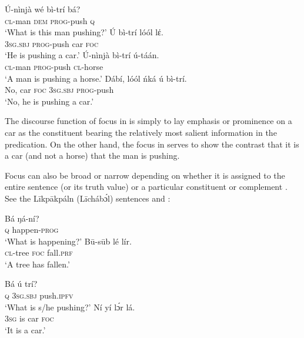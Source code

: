 \documentclass[output=paper,colorlinks,citecolor=brown]{langscibook}
\begin{document}
\ea%
    \label{ex:bisilki:4}
    \ea\label{ex:bisilki:4a}
    \gll    Ú-nìnjà	wé	bì-trí		bá?\\
            \textsc{cl-}man	\textsc{dem}	\textsc{prog-}push	\textsc{q}\\
    \glt    ‘What is this man pushing?’
    \ex\label{ex:bisilki:4b}
    \gll    Ú		bì-trí		lóól	lέ.\\
            \textsc{3sg.sbj}	\textsc{prog-}push	car	\textsc{foc}\\
    \glt    ‘He is pushing a car.’
    \z
\ex%
    \label{ex:bisilki:5}
    \ea\label{ex:bisilki:5a}
    \gll    Ú-nìnjà	bì-trí		ú-táán.\\
            \textsc{cl-}man	\textsc{prog-}push	\textsc{cl-}horse\\
    \glt    ‘A man is pushing a horse.’
    \ex\label{ex:bisilki:5b}
    \gll    Dábí,	lóól	ńká	ú		bì-trí.\\
            No,	car	\textsc{foc}	\textsc{3sg.sbj}	\textsc{prog-}push\\
    \glt    ‘No, he is pushing a car.’
    \z
\z

The discourse function of focus in  is simply to lay emphasis or prominence on a car as the constituent bearing the relatively most salient information in the predication. On the other hand, the focus in  serves to show the contrast that it is a car (and not a horse) that the man is pushing.

Focus can also be broad or narrow depending on whether it is assigned to the entire sentence (or its truth value) or a particular constituent or complement \citep[44]{Dik1981}. See the Līkpākpáln (Līcháb\'{ɔ}l) sentences  and :

\ea%
    \label{ex:bisilki:6}
    \ea\label{ex:bisilki:6a}
    \gll    Bá	ŋá-ní?\\
            \textsc{q}	happen\textsc{-prog}\\
    \glt    ‘What is happening?’
    \ex\label{ex:bisilki:6b}
    \gll    Bū-sūb	lé	lír.\\
            \textsc{cl-}tree		\textsc{foc}	fall\textsc{.prf}\\
    \glt    ‘A tree has fallen.’
    \z
\z

\ea%
    \label{ex:bisilki:7}
    \ea\label{ex:bisilki:7a}
    \gll    Bá	ú		trí?\\
            \textsc{q}	\textsc{3sg.sbj}	push\textsc{.ipfv}\\
    \glt    ‘What is s/he pushing?’
    \ex\label{ex:bisilki:7b}
    \gll    Ní	yí	lɔ́r	lá.\\
            \textsc{3sg}	is	car	\textsc{foc}\\
    \glt    ‘It is a car.’
    \z
\z
\end{document}
